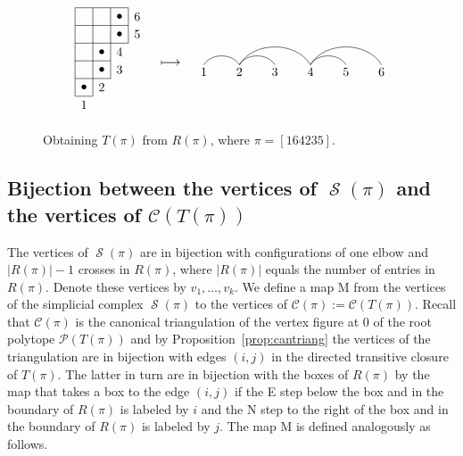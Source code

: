 \documentclass[10pt]{amsart}
\theoremstyle{definition}
\numberwithin{equation}{section}
\newcommand*\C{{\mathcal{C}}}
\renewcommand*\P{{\mathcal{P}}}
\newcommand{\lmp}[1]{\mathrel{\mathop{\longmapsto}^{#1}}}
\newcommand*\+{\smash{\lower2pt\hbox{\rlap{\vrule height14pt}}\raise2pt\hbox{\rlap{\hskip-3pt \vrule height.4pt depth0pt width14.7pt}}}}
\DeclareMathOperator{\Scal}{\mathcal{S}}
\begin{document}
\begin{figure}[h]
\[
\begin{aligned}
\begin{tikzpicture}
\draw (0,1.5)--(1.5,1.5)--(1.5,2.5)--(0.5,2.5)--(0.5,0)--(0,0)--(0,2)--(1.5,2);
\draw (0,0.5)--(1,0.5)--(1,2.5);
\draw (0,1)--(1,1);
\draw (0,2)--(0,2.5)--(0.5,2.5);
\draw (0.25,0.25) node {$\bullet$};
\draw (0.75,0.75) node {$\bullet$};
\draw (0.75,1.25) node {$\bullet$};
\draw (1.25,1.75) node {$\bullet$};
\draw (1.25,2.25) node {$\bullet$};
\draw (0.25,-0.25) node {1};
\draw (0.75,0.25) node {2};
\draw (1.25,0.75) node {3};
\draw (1.25,1.25) node {4};
\draw (1.75,1.75) node {5};
\draw (1.75,2.25) node {6};
\end{tikzpicture}
\end{aligned}
\quad\lmp{}\quad
\begin{aligned}
\begin{tikzpicture}
\path (1,0) edge [bend left=60] (2,0);
\path (2,0) edge [bend left=60] (3,0);
\path (2,0) edge [bend left=60] (4,0);
\path (4,0) edge [bend left=60] (5,0);
\path (4,0) edge [bend left=60] (6,0);
\draw[] (1,-0.2) node {1};
\draw[] (2,-0.2) node {2};
\draw[] (3,-0.2) node {3};
\draw[] (4,-0.2) node {4};
\draw[] (5,-0.2) node {5};
\draw[] (6,-0.2) node {6};
\end{tikzpicture}
\end{aligned}
\]
\caption{Obtaining $T(\pi)$ from $R(\pi)$, where $\pi=[164235]$.}\label{dist}
\end{figure}


\subsection{Bijection between the vertices of \texorpdfstring{$\Scal(\pi)$}{S(pi)} and the vertices of \texorpdfstring{$\C(T(\pi))$}{C(T(pi))}}

The vertices of $\Scal(\pi)$ are in bijection with configurations of one elbow and $|R(\pi)|-1$ crosses in $R(\pi)$, where $|R(\pi)|$ equals the number of entries in $R(\pi)$. Denote these vertices by $v_1, \dots, v_k$. We define a map M from the vertices of the simplicial complex $\Scal(\pi)$ to the vertices of $\C(\pi):=\C(T(\pi))$. Recall that $\C(\pi)$ is the canonical triangulation of the vertex figure at $0$ of the root polytope $\P(T(\pi))$ and by Proposition~\ref{prop:cantriang} the vertices of the triangulation are in bijection with edges $(i,j)$ in the directed transitive closure of $T(\pi)$. The latter in turn are in bijection with the boxes of $R(\pi)$ by the map that takes a box to the edge $(i,j)$ if the E step below the box and in the boundary of $R(\pi)$ is labeled by $i$ and the N step to the right of the box and in the boundary of $R(\pi)$ is labeled by $j$. The map M is defined analogously as follows.
\end{document}
